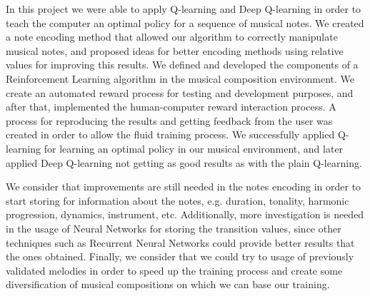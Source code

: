 In this project we were able to apply Q-learning and Deep Q-learning in order to teach the computer an optimal policy for a sequence of musical notes. We created a note encoding method that allowed our algorithm to correctly manipulate musical notes, and proposed ideas for better encoding methods using relative values for improving this results. We defined and developed the components of a Reinforcement Learning algorithm in the musical composition environment. We create an automated reward process for testing and development purposes, and after that, implemented the human-computer reward interaction process. A process for reproducing the results and getting feedback from the user was created in order to allow the fluid training process. We successfully applied Q-learning for learning an optimal policy in our musical environment, and later applied Deep Q-learning not getting as good results as with the plain Q-learning.

We consider that improvements are still needed in the notes encoding in order to start storing for information about the notes, e.g. duration, tonality, harmonic progression, dynamics, instrument, etc. Additionally, more investigation is needed in the usage of Neural Networks for storing the transition values, since other techniques such as Recurrent Neural Networks could provide better results that the ones obtained. Finally, we consider that we could try to usage of previously validated melodies in order to speed up the training process and create some diversification of musical compositions on which we can base our training.